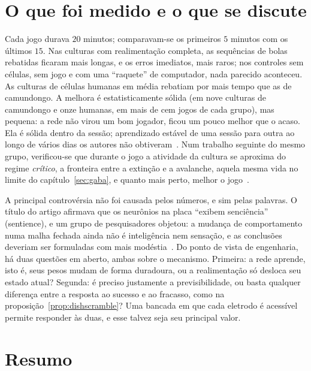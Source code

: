 \section{O que foi medido e o que se discute}

Cada jogo durava $20$ minutos; comparavam-se os primeiros $5$ minutos com os últimos $15$. Nas culturas com realimentação completa, as sequências de bolas rebatidas ficaram mais longas, e os erros imediatos, mais raros; nos controles sem células, sem jogo e com uma ``raquete'' de computador, nada parecido aconteceu. As culturas de células humanas em média rebatiam por mais tempo que as de camundongo. A melhora é estatisticamente sólida (em nove culturas de camundongo e onze humanas, em mais de cem jogos de cada grupo), mas pequena: a rede não virou um bom jogador, ficou um pouco melhor que o acaso. Ela é sólida dentro da sessão; aprendizado estável de uma sessão para outra ao longo de vários dias os autores não obtiveram~\cite{Kagan2022}. Num trabalho seguinte do mesmo grupo, verificou-se que durante o jogo a atividade da cultura se aproxima do regime \emph{crítico}, a fronteira entre a extinção e a avalanche, aquela mesma vida no limite do capítulo~\ref{sec:gaba}, e quanto mais perto, melhor o jogo~\cite{Habibollahi2023}.

A principal controvérsia não foi causada pelos números, e sim pelas palavras. O título do artigo afirmava que os neurônios na placa ``exibem senciência'' (sentience), e um grupo de pesquisadores objetou: a mudança de comportamento numa malha fechada ainda não é inteligência nem sensação, e as conclusões deveriam ser formuladas com mais modéstia~\cite{Balci2023}. Do ponto de vista de engenharia, há duas questões em aberto, ambas sobre o mecanismo. Primeira: a rede aprende, isto é, seus pesos mudam de forma duradoura, ou a realimentação só desloca seu estado atual? Segunda: é preciso justamente a previsibilidade, ou basta qualquer diferença entre a resposta ao sucesso e ao fracasso, como na proposição~\ref{prop:dishscramble}? Uma bancada em que cada eletrodo é acessível permite responder às duas, e esse talvez seja seu principal valor.



\section{Resumo}


